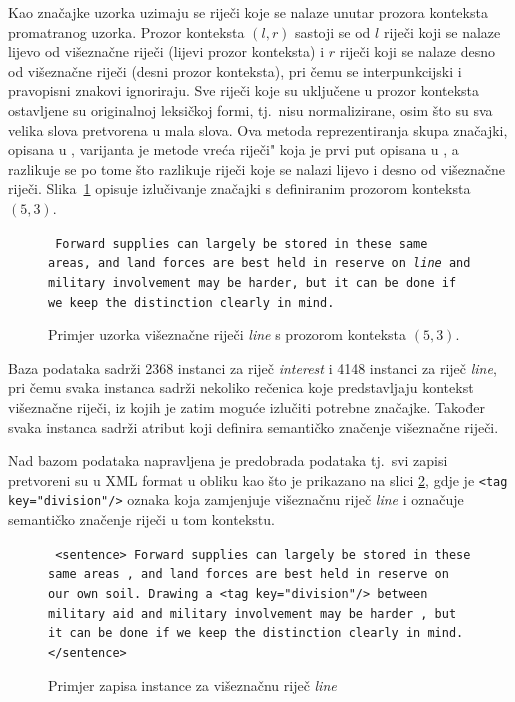\documentclass[10pt, a4paper]{article}
\begin{document}
Kao značajke uzorka uzimaju se riječi koje se nalaze unutar prozora konteksta promatranog uzorka.
Prozor konteksta $(l,r)$  sastoji se
od $l$ riječi koji se nalaze lijevo od višeznačne riječi (lijevi prozor konteksta) 
i $r$ riječi koji se nalaze desno od višeznačne riječi (desni prozor konteksta), pri čemu se
interpunkcijski i pravopisni znakovi ignoriraju. Sve riječi koje su uključene u prozor konteksta ostavljene su originalnoj leksičkoj formi, tj.~nisu normalizirane, osim što su sva velika
slova pretvorena u mala slova. 
Ova metoda reprezentiranja skupa značajki,
opisana u \citep{pedersen}, varijanta je metode \glqq vreća riječi"  koja je
prvi put opisana u \citep{gale-etc}, a razlikuje se po tome što razlikuje 
riječi koje se nalazi lijevo i desno od višeznačne riječi. \mbox{Slika \ref{window_of_context}}
opisuje izlučivanje značajki s definiranim prozorom konteksta $(5,3)$.

\begin{figure}[!hbtp]
{\small \texttt{     Forward supplies can largely be stored in these same areas, and land forces are best held in reserve on  \emph{line}  and military involvement may be harder, but it can be done if we keep the distinction clearly in mind.}}
\caption{Primjer uzorka višeznačne riječi \emph{line} s prozorom konteksta $(5, 3)$.\label{window_of_context}}
\end{figure}

Baza podataka sadrži 2368 instanci za riječ \emph{interest} i 4148 instanci za riječ \emph{line}, 
pri čemu svaka instanca sadrži nekoliko rečenica koje predstavljaju kontekst višeznačne riječi,
iz kojih je zatim moguće izlučiti potrebne značajke. Također svaka instanca sadrži atribut koji 
definira semantičko značenje višeznačne riječi.

Nad bazom podataka napravljena je predobrada podataka tj.~svi zapisi pretvoreni su u XML format
u obliku kao što je prikazano na slici \ref{fig:instance_example}, gdje je \texttt{<tag key="division"/>}
oznaka koja zamjenjuje višeznačnu riječ \emph{line} i označuje semantičko značenje riječi u tom kontekstu.

\begin{figure}[!hbtp]
{\small \texttt{
<sentence>
Forward supplies can largely be stored in these same areas , and land forces are best held in reserve on our own soil. Drawing a  <tag key="division"/>  between military aid and military involvement may be harder , but it can be done if we keep the distinction clearly in mind.
</sentence>}}
\caption{Primjer zapisa instance za višeznačnu riječ \emph{line}
\label{fig:instance_example}}
\end{figure}
\end{document}

